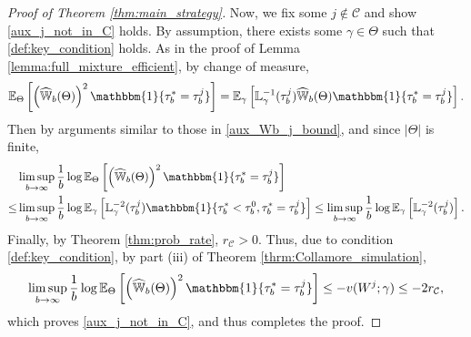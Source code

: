 \documentclass[aap,preprint]{imsart}
\newcommand{\Exp}{{\mathbb{E}}}
\theoremstyle{plain}
\theoremstyle{definition}
\begin{document}
\begin{appendix}
\begin{proof}[Proof of Theorem \ref{thm:main_strategy}]
Now, we fix some $j \not \in \mathcal{C}$ and show \eqref{aux_j_not_in_C} holds. By assumption, there exists some $\gamma \in \Theta$ such that \eqref{def:key_condition} holds. As in the proof of Lemma \ref{lemma:full_mixture_efficient}, by change of measure,
\begin{align*}
    \Exp_{\Theta}\left[ \left(\widehat{\mathbb{W}}_{b}(\Theta) \right)^2 \mathbbm{1}\{\tau_b^* = \tau_b^j\}\right] =
     \Exp_{\gamma}\left[ 
     \mathbb{L}_{\gamma}^{-1}(\tau_b^j)
     \widehat{\mathbb{W}}_{b}(\Theta)  \mathbbm{1}\{\tau_b^* = \tau_b^j\}\right].
\end{align*}
Then by arguments similar to those  in \eqref{aux_Wb_j_bound}, and since $|\Theta|$ is finite,
\begin{align*}
        &\limsup_{b\to \infty} \frac{1}{b} \log  \Exp_{\Theta}\left[ \left(\widehat{\mathbb{W}}_{b}(\Theta) \right)^2 \mathbbm{1}\{\tau_b^* = \tau_b^j\}\right]  \\
        \leq 
        &     \limsup_{b\to \infty} \frac{1}{b} \log  \Exp_{\gamma}\left[ \mathbb{L}_{\gamma}^{-2}(\tau_b^j) \mathbbm{1}\{\tau_b^* < \tau_b^0, \tau_b^* = \tau_b^j\}\right]\leq \limsup_{b\to \infty} \frac{1}{b} \log  \Exp_{\gamma}\left[ \mathbb{L}_{\gamma}^{-2}(\tau_b^j) \right].
\end{align*}
Finally, by Theorem \ref{thm:prob_rate}, $r_{\mathcal{C}} > 0$. Thus, due to condition \eqref{def:key_condition}, by part (iii) of Theorem \ref{thrm:Collamore_simulation},  
\begin{align*}
    \limsup_{b\to \infty} \frac{1}{b} \log  \Exp_{\Theta}\left[ \left(\widehat{\mathbb{W}}_{b}(\Theta) \right)^2 \mathbbm{1}\{\tau_b^* = \tau_b^j\}\right]  \leq - 
    v(W^j; \gamma)
    \leq -2 r_{\mathcal{C}},
\end{align*}
which proves \eqref{aux_j_not_in_C}, and thus completes the proof.
\end{proof}



\end{appendix}
\end{document}
